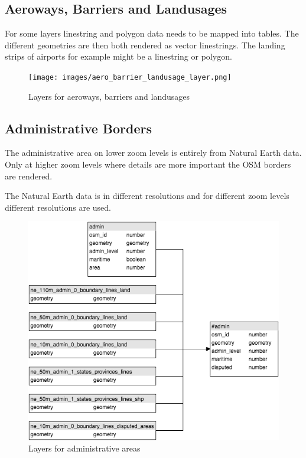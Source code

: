\newpage
\subsection{Aeroways, Barriers and Landusages}

For some layers linestring and polygon data needs to be mapped into tables.
The different geometries are then both rendered as vector linestrings.
The landing strips of airports for example might be a linestring or polygon.

\begin{figure}[H]
\centering
  \texttt{[image: images/aero\_barrier\_landusage\_layer.png]}
  \caption{Layers for aeroways, barriers and landusages}
\end{figure}

\newpage
\subsection{Administrative Borders}
The administrative area on lower zoom levels is entirely from Natural Earth data.
Only at higher zoom levels where details are more important the OSM borders are rendered.

The Natural Earth data is in different resolutions and for different zoom levels different
resolutions are used.

\begin{figure}[H]
  \centering
  \includegraphics[scale=0.6]{images/admin_layer.png}
  \caption{Layers for administrative areas}
\end{figure}

